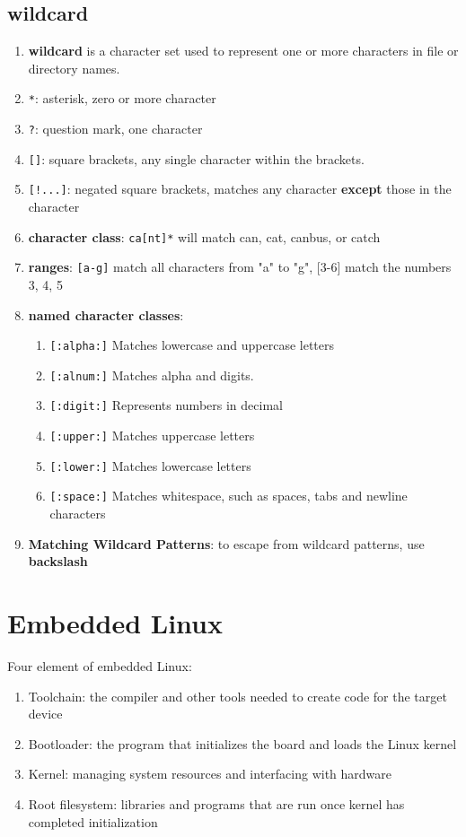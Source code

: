 \documentclass[12pt,a4paper]{article}
\begin{document}
\subsection{wildcard}
\begin{enumerate}
	\item \textbf{wildcard} is a character set used to represent one or more characters in file or directory names.
	\item \texttt{*}: asterisk, zero or more character
	\item \texttt{?}: question mark, one character
	\item \texttt{[]}: square brackets, any single character within the brackets.
	\item \texttt{[!...]}: negated square brackets, matches any character \textbf{except} those in the character
	\item \textbf{character class}: \texttt{ca[nt]*} will match can, cat, canbus, or catch
	\item \textbf{ranges}: \texttt{[a-g]} match all characters from "a" to "g", [3-6] match the numbers 3, 4, 5
	\item \textbf{named character classes}:
	\begin{enumerate}
		\item \texttt{[:alpha:]} Matches lowercase and uppercase letters
		\item \texttt{[:alnum:]} Matches alpha and digits.
		\item \texttt{[:digit:]} Represents numbers in decimal
		\item \texttt{[:upper:]} Matches uppercase letters
		\item \texttt{[:lower:]} Matches lowercase letters
		\item \texttt{[:space:]} Matches whitespace, such as spaces, tabs and newline characters
	\end{enumerate}		
	\item \textbf{Matching Wildcard Patterns}: to escape from wildcard patterns, use \textbf{backslash}
\end{enumerate}

\section{Embedded Linux}
Four element of embedded Linux:
\begin{enumerate}
	\item Toolchain: the compiler and other tools needed to create code for the target device
	\item Bootloader: the program that initializes the board and loads the Linux kernel
	\item Kernel: managing system resources and interfacing with hardware
	\item Root filesystem: libraries and programs that are run once kernel has completed initialization
\end{enumerate}
\end{document}

